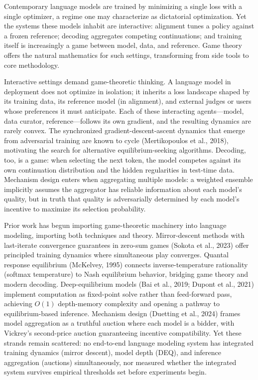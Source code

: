 
Contemporary language models are trained by minimizing a single loss with a single optimizer, a regime one may characterize as dictatorial optimization. Yet the systems these models inhabit are interactive: alignment tunes a policy against a frozen reference; decoding aggregates competing continuations; and training itself is increasingly a game between model, data, and reference. Game theory offers the natural mathematics for such settings, transforming from side tools to core methodology.

Interactive settings demand game-theoretic thinking. A language model in deployment does not optimize in isolation; it inherits a loss landscape shaped by its training data, its reference model (in alignment), and external judges or users whose preferences it must anticipate. Each of these interacting agents---model, data curator, reference---follows its own gradient, and the resulting dynamics are rarely convex. The synchronized gradient-descent-ascent dynamics that emerge from adversarial training are known to cycle (Mertikopoulos et al., 2018), motivating the search for alternative equilibrium-seeking algorithms. Decoding, too, is a game: when selecting the next token, the model competes against its own continuation distribution and the hidden regularities in test-time data. Mechanism design enters when aggregating multiple models: a weighted ensemble implicitly assumes the aggregator has reliable information about each model's quality, but in truth that quality is adversarially determined by each model's incentive to maximize its selection probability.

Prior work has begun importing game-theoretic machinery into language modeling, importing both techniques and theory. Mirror-descent methods with last-iterate convergence guarantees in zero-sum games (Sokota et al., 2023) offer principled training dynamics where simultaneous play converges. Quantal response equilibrium (McKelvey, 1995) connects inverse-temperature rationality (softmax temperature) to Nash equilibrium behavior, bridging game theory and modern decoding. Deep-equilibrium models (Bai et al., 2019; Dupont et al., 2021) implement computation as fixed-point solve rather than feed-forward pass, achieving $O(1)$ depth-memory complexity and opening a pathway to equilibrium-based inference. Mechanism design (Duetting et al., 2024) frames model aggregation as a truthful auction where each model is a bidder, with Vickrey's second-price auction guaranteeing incentive compatibility. Yet these strands remain scattered: no end-to-end language modeling system has integrated training dynamics (mirror descent), model depth (DEQ), and inference aggregation (auctions) simultaneously, nor measured whether the integrated system survives empirical thresholds set before experiments begin.

